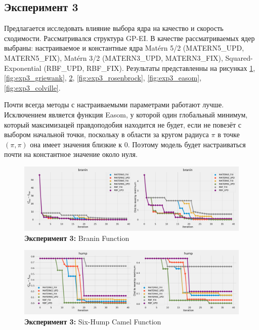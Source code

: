 \documentclass[12pt,fleqn]{article}
\begin{document}
	
	
	\newpage
	\subsection{Эксперимент 3}
	Предлагается исследовать влияние выбора ядра на качество и скорость сходимости.
	Рассматривался структура GP-EI. В качестве рассматриваемых ядер выбраны: настраиваемое и константные ядра Matérn 5/2 (MATERN5\_UPD, MATERN5\_FIX), Matérn 3/2 (MATERN3\_UPD, MATERN3\_FIX), Squared-Exponential (RBF\_UPD, RBF\_FIX). Результаты представленны на рисунках \ref{fig:exp3_branin}, \ref{fig:exp3_griewank}, \ref{fig:exp3_hump}, \ref{fig:exp3_rosenbrock}, \ref{fig:exp3_easom}, \ref{fig:exp3_colville}.
	
		Почти всегда методы с настраиваемыми параметрами работают лучше. Исключением является функция Easom, у которой один глобальный минимум, который максимизацей правдоподобия находится не будет, если не повезёт с выбором начальной точки, поскольку в области за кругом радиуса $\pi$ в точке $(\pi, \pi)$ она имеет значения близкие к 0. Поэтому модель будет настраиваться почти на константное значение около нуля. 
	\begin{figure}[!h]
		\includegraphics[scale=0.25,center]{../code/exp3/branin.pdf}
		\caption{\textbf{Эксперимент 3:} Branin Function}
		\label{fig:exp3_branin}
	\end{figure}
	
	\begin{figure}[!h]
		\includegraphics[scale=0.25,center]{../code/exp3/hump.pdf}
		\caption{\textbf{Эксперимент 3:} Six-Hump Camel Function}
		\label{fig:exp3_hump}
	\end{figure}
	
\end{document}
